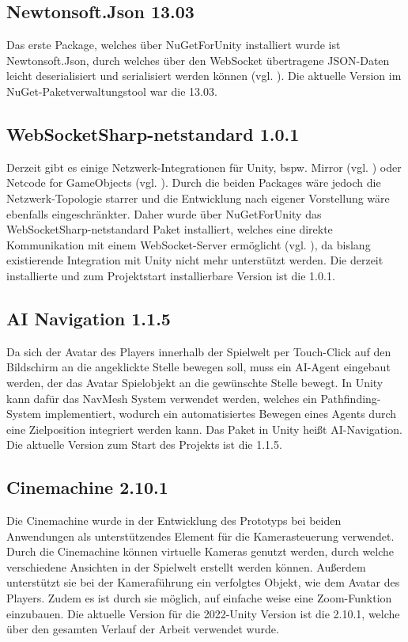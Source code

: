 \subsection{Newtonsoft.Json 13.03}
Das erste Package, welches über NuGetForUnity installiert wurde ist Newtonsoft.Json, durch welches über den WebSocket übertragene JSON-Daten leicht deserialisiert und serialisiert werden können (vgl. \citealp{newton-king_jsonnet_2023}). Die aktuelle Version im NuGet-Paketverwaltungstool war die 13.03.

\subsection{WebSocketSharp-netstandard 1.0.1}
Derzeit gibt es einige Netzwerk-Integrationen für Unity, bspw. Mirror (vgl. \citealp{mirrornetworking_mirrornetworkingmirror_2025}) oder Netcode for GameObjects (vgl. \citealp{reeve_about_2025}). Durch die beiden Packages wäre jedoch die Netzwerk-Topologie starrer und die Entwicklung nach eigener Vorstellung wäre ebenfalls eingeschränkter. Daher wurde über NuGetForUnity das WebSocketSharp-netstandard Paket installiert, welches eine direkte Kommunikation mit einem WebSocket-Server ermöglicht (vgl. \citealp{pingman_tools_websocket-sharp_2017}), da bislang existierende Integration mit Unity nicht mehr unterstützt werden. Die derzeit installierte und zum Projektstart installierbare Version ist die 1.0.1.

\subsection{AI Navigation 1.1.5}
Da sich der Avatar des Players innerhalb der Spielwelt per Touch-Click auf den Bildschirm an die angeklickte Stelle bewegen soll, muss ein \ac{AI}-Agent eingebaut werden, der das Avatar Spielobjekt an die gewünschte Stelle bewegt. In Unity kann dafür das NavMesh System verwendet werden, welches ein Pathfinding-System implementiert, wodurch ein automatisiertes Bewegen eines Agents durch eine Zielposition integriert werden kann. Das Paket in Unity heißt \ac{AI}-Navigation. Die aktuelle Version zum Start des Projekts ist die 1.1.5.

\subsection{Cinemachine 2.10.1}
Die Cinemachine wurde in der Entwicklung des Prototyps bei beiden Anwendungen als unterstützendes Element für die Kamerasteuerung verwendet. Durch die Cinemachine können virtuelle Kameras genutzt werden, durch welche verschiedene Ansichten in der Spielwelt erstellt werden können. Außerdem unterstützt sie bei der Kameraführung ein verfolgtes Objekt, wie dem Avatar des Players. Zudem es ist durch sie möglich, auf einfache weise eine Zoom-Funktion einzubauen. Die aktuelle Version für die 2022-Unity Version ist die 2.10.1, welche über den gesamten Verlauf der Arbeit verwendet wurde.

